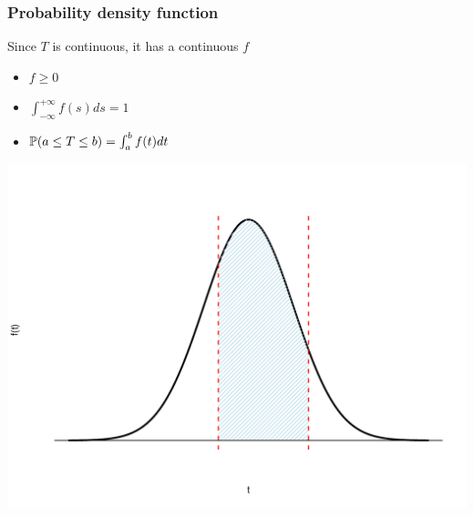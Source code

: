 \documentclass[aspectratio=169]{beamer}\usepackage[]{graphicx}\usepackage[]{xcolor}
\begin{document}
\begin{frame}\frametitle{Probability density function}
Since $T$ is continuous, it has a continuous  $f$
\begin{minipage}{0.4\textwidth}
\begin{itemize}
\item $f\geq 0$
\item $\int_{-\infty}^{+\infty}f(s)ds=1$
\item $\mathbb{P}(a\leq T\leq b)=\int_a^bf(t)dt$
\end{itemize}
\end{minipage}
\begin{minipage}{0.59\textwidth}
\includegraphics[width=\textwidth]{FIGS/L23-distrib_a_b-1.pdf}
\end{minipage}
\end{frame}
\end{document}
